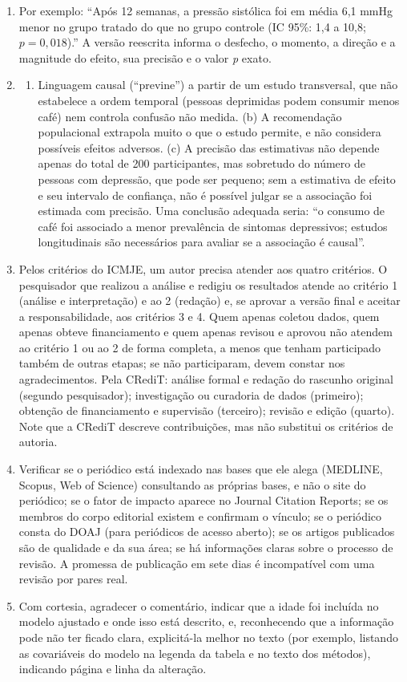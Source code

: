 \documentclass[
]{book}
\providecommand{\tightlist}{%
  \setlength{\itemsep}{0pt}\setlength{\parskip}{0pt}}
\begin{document}
\begin{enumerate}
\def\labelenumi{\arabic{enumi}.}
\item
  Por exemplo: ``Após 12 semanas, a pressão sistólica foi em média 6,1 mmHg menor no grupo tratado do que no grupo controle (IC 95\%: 1,4 a 10,8; \(p = 0{,}018\)).'' A versão reescrita informa o desfecho, o momento, a direção e a magnitude do efeito, sua precisão e o valor \emph{p} exato.
\item
  \begin{enumerate}
  \def\labelenumii{(\alph{enumii})}
  \tightlist
  \item
    Linguagem causal (``previne'') a partir de um estudo transversal, que não estabelece a ordem temporal (pessoas deprimidas podem consumir menos café) nem controla confusão não medida. (b) A recomendação populacional extrapola muito o que o estudo permite, e não considera possíveis efeitos adversos. (c) A precisão das estimativas não depende apenas do total de 200 participantes, mas sobretudo do número de pessoas com depressão, que pode ser pequeno; sem a estimativa de efeito e seu intervalo de confiança, não é possível julgar se a associação foi estimada com precisão. Uma conclusão adequada seria: ``o consumo de café foi associado a menor prevalência de sintomas depressivos; estudos longitudinais são necessários para avaliar se a associação é causal''.
  \end{enumerate}
\item
  Pelos critérios do ICMJE, um autor precisa atender aos quatro critérios. O pesquisador que realizou a análise e redigiu os resultados atende ao critério 1 (análise e interpretação) e ao 2 (redação) e, se aprovar a versão final e aceitar a responsabilidade, aos critérios 3 e 4. Quem apenas coletou dados, quem apenas obteve financiamento e quem apenas revisou e aprovou não atendem ao critério 1 ou ao 2 de forma completa, a menos que tenham participado também de outras etapas; se não participaram, devem constar nos agradecimentos. Pela CRediT: análise formal e redação do rascunho original (segundo pesquisador); investigação ou curadoria de dados (primeiro); obtenção de financiamento e supervisão (terceiro); revisão e edição (quarto). Note que a CRediT descreve contribuições, mas não substitui os critérios de autoria.
\item
  Verificar se o periódico está indexado nas bases que ele alega (MEDLINE, Scopus, Web of Science) consultando as próprias bases, e não o site do periódico; se o fator de impacto aparece no Journal Citation Reports; se os membros do corpo editorial existem e confirmam o vínculo; se o periódico consta do DOAJ (para periódicos de acesso aberto); se os artigos publicados são de qualidade e da sua área; se há informações claras sobre o processo de revisão. A promessa de publicação em sete dias é incompatível com uma revisão por pares real.
\item
  Com cortesia, agradecer o comentário, indicar que a idade foi incluída no modelo ajustado e onde isso está descrito, e, reconhecendo que a informação pode não ter ficado clara, explicitá-la melhor no texto (por exemplo, listando as covariáveis do modelo na legenda da tabela e no texto dos métodos), indicando página e linha da alteração.
\end{enumerate}
\end{document}
